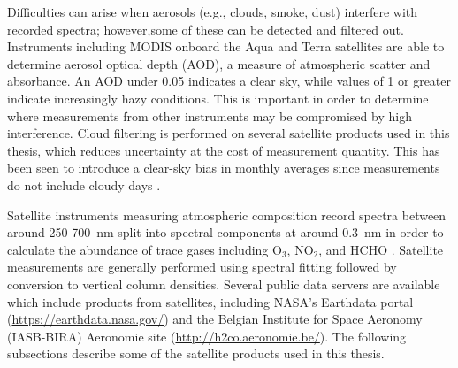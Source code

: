     Difficulties can arise when aerosols (e.g., clouds, smoke, dust) interfere with recorded spectra; however,some of these can be detected and filtered out.
    Instruments including MODIS onboard the Aqua and Terra satellites are able to determine aerosol optical depth (AOD), a measure of atmospheric scatter and absorbance. 
    An AOD under 0.05 indicates a clear sky, while values of 1 or greater indicate increasingly hazy conditions.
    This is important in order to determine where measurements from other instruments may be compromised by high interference.
    Cloud filtering is performed on several satellite products used in this thesis, which reduces uncertainty at the cost of measurement quantity. 
    This has been seen to introduce a clear-sky bias in monthly averages since measurements do not include cloudy days \parencite{Surl2018}.
    
    Satellite instruments measuring atmospheric composition record spectra between around 250-700~nm split into spectral components at around $0.3$~nm in order to calculate the abundance of trace gases including O$_3$, NO$_2$, and HCHO \parencite[e.g.,][]{Leue2001}.
    Satellite measurements are generally performed using spectral fitting followed by conversion to vertical column densities.
    Several public data servers are available which include products from satellites, including NASA's Earthdata portal (\url{https://earthdata.nasa.gov/}) and the Belgian Institute for Space Aeronomy (IASB-BIRA) Aeronomie site (\url{http://h2co.aeronomie.be/}).
    The following subsections describe some of the satellite products used in this thesis.
    
    
